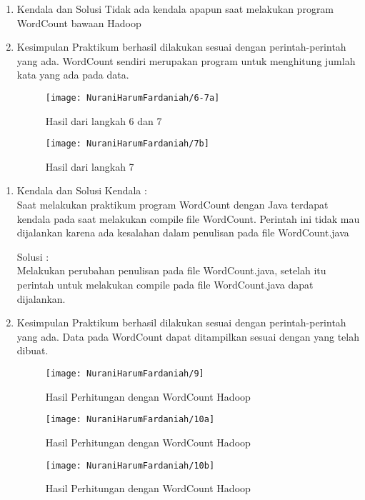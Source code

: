 \begin{enumerate}
\item Kendala dan Solusi
\newline Tidak ada kendala apapun saat melakukan program WordCount bawaan Hadoop

\item Kesimpulan
\newline Praktikum berhasil dilakukan sesuai dengan perintah-perintah yang ada. WordCount sendiri merupakan program untuk menghitung jumlah kata yang ada pada data.


\begin{figure}[!ht]
\texttt{[image: NuraniHarumFardaniah/6-7a]}
\caption{Hasil dari langkah 6 dan 7}
\label{gam:perkuliahan-25-11}
\end{figure}
\newpage
\begin{figure}[!ht]
\texttt{[image: NuraniHarumFardaniah/7b]}
\caption{Hasil dari langkah 7}
\label{gam:perkuliahan-25-11}
\end{figure}

\end{enumerate}

\begin{enumerate}
\item Kendala dan Solusi
\newline Kendala :\\
Saat melakukan praktikum program WordCount dengan Java terdapat kendala pada saat melakukan compile file WordCount. Perintah ini tidak mau dijalankan karena ada kesalahan dalam penulisan pada file WordCount.java

Solusi :\\
Melakukan perubahan penulisan pada file WordCount.java, setelah itu perintah untuk melakukan compile pada file WordCount.java dapat dijalankan.

\item Kesimpulan
\newline Praktikum berhasil dilakukan sesuai dengan perintah-perintah yang ada. Data pada WordCount dapat ditampilkan sesuai dengan yang telah dibuat.


\begin{figure}[!ht]
\texttt{[image: NuraniHarumFardaniah/9]}
\caption{Hasil Perhitungan dengan WordCount Hadoop}
\label{gam:perkuliahan-25-11}
\end{figure}

\begin{figure}[!ht]
\texttt{[image: NuraniHarumFardaniah/10a]}
\caption{Hasil Perhitungan dengan WordCount Hadoop}
\label{gam:perkuliahan-25-11}
\end{figure}
\newpage
\begin{figure}[!ht]
\texttt{[image: NuraniHarumFardaniah/10b]}
\caption{Hasil Perhitungan dengan WordCount Hadoop}
\label{gam:perkuliahan-25-11}
\end{figure}

\end{enumerate}
